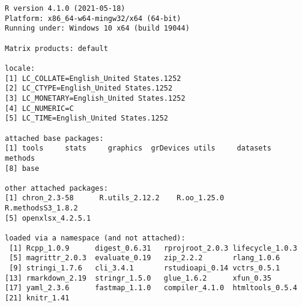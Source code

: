 \documentclass[
]{article}
\begin{document}
\begin{verbatim}
R version 4.1.0 (2021-05-18)
Platform: x86_64-w64-mingw32/x64 (64-bit)
Running under: Windows 10 x64 (build 19044)

Matrix products: default

locale:
[1] LC_COLLATE=English_United States.1252 
[2] LC_CTYPE=English_United States.1252   
[3] LC_MONETARY=English_United States.1252
[4] LC_NUMERIC=C                          
[5] LC_TIME=English_United States.1252    

attached base packages:
[1] tools     stats     graphics  grDevices utils     datasets  methods  
[8] base     

other attached packages:
[1] chron_2.3-58      R.utils_2.12.2    R.oo_1.25.0       R.methodsS3_1.8.2
[5] openxlsx_4.2.5.1 

loaded via a namespace (and not attached):
 [1] Rcpp_1.0.9      digest_0.6.31   rprojroot_2.0.3 lifecycle_1.0.3
 [5] magrittr_2.0.3  evaluate_0.19   zip_2.2.2       rlang_1.0.6    
 [9] stringi_1.7.6   cli_3.4.1       rstudioapi_0.14 vctrs_0.5.1    
[13] rmarkdown_2.19  stringr_1.5.0   glue_1.6.2      xfun_0.35      
[17] yaml_2.3.6      fastmap_1.1.0   compiler_4.1.0  htmltools_0.5.4
[21] knitr_1.41     
\end{verbatim}
\end{document}
